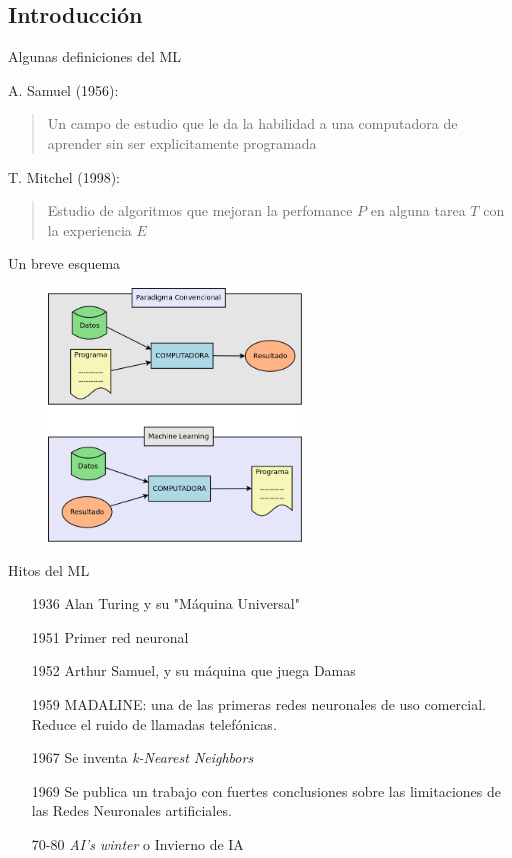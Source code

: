 \documentclass[11pt]{beamer}
\begin{document}
\subsection{Introducci\'on}
\begin{frame}{Algunas definiciones del ML}


    A. Samuel (1956):
    \begin{quote}
        Un campo de estudio que le da la habilidad a una computadora de aprender sin ser explicitamente programada
    \end{quote}
    T. Mitchel (1998):
    \begin{quote}
        Estudio de algoritmos que mejoran la perfomance $P$ en alguna tarea $T$ con la experiencia $E$
    \end{quote}
\end{frame}
\begin{frame}{Un breve esquema}
    \begin{figure}
        \centering
        \includegraphics[width=0.6\textwidth]{images/ML_vs_programming.png}
        \label{fig:ML_vs_conventional}
    \end{figure}
\end{frame}
\begin{frame}{Hitos del ML}
\begin{itemize}
    \item[1936] Alan Turing y su "M\'aquina Universal"
    \item[1951] Primer red neuronal
    \item[1952] Arthur Samuel, y su m\'aquina que juega Damas
    \item[1959] MADALINE: una de las primeras redes neuronales de uso comercial. Reduce el ruido de llamadas telef\'onicas.
    \item[1967] Se inventa \textit{k-Nearest Neighbors}
    \item[1969] Se publica un trabajo con fuertes conclusiones sobre las limitaciones de las Redes Neuronales artificiales.
    \item[70-80] \textit{AI's winter} o Invierno de IA
\end{itemize}
\end{frame}
\end{document}
